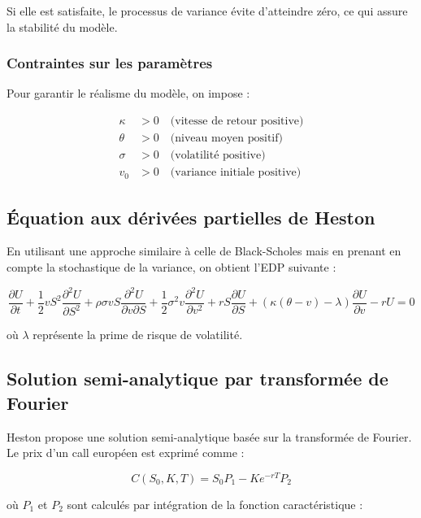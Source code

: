 Si elle est satisfaite, le processus de variance évite d'atteindre zéro, ce qui assure la stabilité du modèle.

\subsubsection{Contraintes sur les paramètres}
Pour garantir le réalisme du modèle, on impose :

\begin{align*}
	\kappa &> 0 \quad \text{(vitesse de retour positive)} \\
	\theta &> 0 \quad \text{(niveau moyen positif)} \\
	\sigma &> 0 \quad \text{(volatilité positive)} \\
	v_0 &> 0 \quad \text{(variance initiale positive)}
\end{align*}

\subsection{Équation aux dérivées partielles de Heston}

En utilisant une approche similaire à celle de Black-Scholes mais en prenant en compte la stochastique de la variance, on obtient l'EDP suivante :

\begin{equation}
	\frac{\partial U}{\partial t} + \frac{1}{2} v S^2 \frac{\partial^2 U}{\partial S^2} + \rho \sigma v S \frac{\partial^2 U}{\partial v \partial S} + \frac{1}{2} \sigma^2 v \frac{\partial^2 U}{\partial v^2} + rS \frac{\partial U}{\partial S} + (\kappa(\theta - v) - \lambda) \frac{\partial U}{\partial v} - rU = 0
\end{equation}

où $\lambda$ représente la prime de risque de volatilité.

\subsection{Solution semi-analytique par transformée de Fourier}

Heston propose une solution semi-analytique basée sur la transformée de Fourier. Le prix d'un call européen est exprimé comme :

\begin{equation}
	C(S_0, K, T) = S_0 P_1 - Ke^{-rT} P_2
\end{equation}

où $P_1$ et $P_2$ sont calculés par intégration de la fonction caractéristique :


